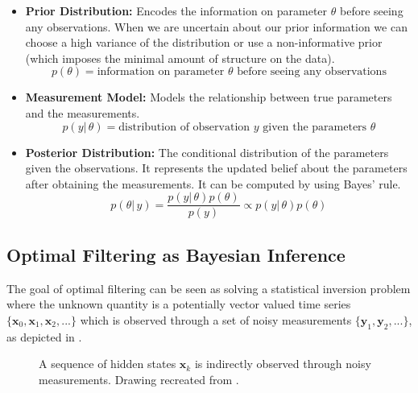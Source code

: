\begin{itemize}
\item \textbf{Prior Distribution:}
Encodes the information on parameter $\theta$ before seeing any
observations. When we are uncertain about our prior information
we can choose a high variance of the distribution or use a
non-informative prior (which imposes the minimal amount of structure
on the data).
$$ p(\theta) = \text{information on parameter } \theta
\text{ before seeing any observations} $$

\item \textbf{Measurement Model:}
Models the relationship between true parameters and the measurements.
$$ p(y |\, \theta) = \text{distribution of observation } y
\text{ given the parameters } \theta $$

\item \textbf{Posterior Distribution:}
The conditional distribution of the parameters given the observations.
It represents the updated belief about the parameters
after obtaining the measurements. It can be computed by using Bayes' rule.
$$ p(\theta |\, y) = \frac{p(y |\, \theta) p(\theta)}{p(y)}
\propto p(y |\, \theta) p(\theta) $$
\end{itemize}

\subsection{Optimal Filtering as Bayesian Inference}
The goal of optimal filtering can be seen as solving a statistical
inversion problem where
the unknown quantity is a potentially vector valued
time series $\{\mathbf{x}_0, \mathbf{x}_1, \mathbf{x}_2,...\}$ which
is observed through a set of noisy measurements
$\{\mathbf{y}_1, \mathbf{y}_2,...\}$, as depicted in .

\begin{figure}[ht!]
    \centering
 \caption{A sequence of  hidden states $\mathbf{x}_k$ is indirectly
 observed through noisy measurements. Drawing recreated from \citep{sarkka2013bayesian}.}
    \label{fig:inversion}
\end{figure}

